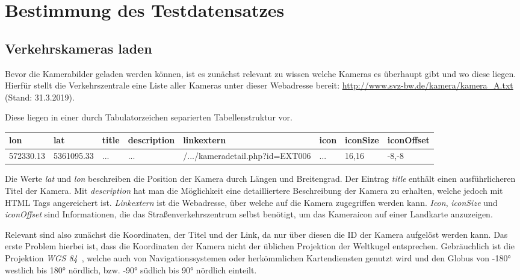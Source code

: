 \section{Bestimmung des Testdatensatzes}
\subsection{Verkehrskameras laden}
\label{sec:AnaCam}
Bevor die Kamerabilder geladen werden können, ist es zunächst relevant zu wissen welche Kameras es überhaupt gibt und wo diese liegen.
Hierfür stellt die Verkehrszentrale eine Liste aller Kameras unter dieser Webadresse bereit: \url{http://www.svz-bw.de/kamera/kamera_A.txt} (Stand: 31.3.2019).

Diese liegen in einer durch Tabulatorzeichen separierten Tabellenstruktur vor.

\begin{center}
\scriptsize
    \begin{tabular}{ | l | l | l | l | l | l | l | l |}
    \hline
		lon & lat & title & description & linkextern & icon & iconSize & iconOffset \\ \hline
    572330.13 &
		5361095.33 &
		... &
		... &
		/.../kameradetail.php?id=EXT006 &
		... &
		16,16 &
		-8,-8 \\
    \hline
    \end{tabular}
\end{center}

Die Werte {\em lat} und {\em lon} beschreiben die Position der Kamera durch Längen und Breitengrad.
Der Eintrag {\em title} enthält einen ausführlicheren Titel der Kamera. Mit {\em description} hat man die Möglichkeit eine detailliertere Beschreibung der Kamera zu erhalten, welche jedoch mit HTML Tags angereichert ist. {\em Linkextern} ist die Webadresse, über welche auf die Kamera zugegriffen werden kann. {\em Icon}, {\em iconSize} und {\em iconOffset} sind Informationen, die das Straßenverkehrszentrum selbst benötigt, um das Kameraicon auf einer Landkarte anzuzeigen.

Relevant sind also zunächst die Koordinaten, der Titel und der Link, da nur über diesen die ID der Kamera aufgelöst werden kann.
Das erste Problem hierbei ist, dass die Koordinaten der Kamera nicht der üblichen Projektion der Weltkugel entsprechen. Gebräuchlich ist die Projektion {\em WGS 84}~\cite{wgs84}, welche auch von Navigationssystemen oder herkömmlichen Kartendiensten genutzt wird und den Globus von -180° westlich bis 180° nördlich, bzw. -90° südlich bis 90° nördlich einteilt.

